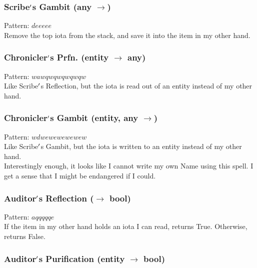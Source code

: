 \documentclass[12pt]{article}
\begin{document}
  \label{sec: patterns/readwrite@hexcasting:write}
\subsubsection*{Scribe$\rq$s Gambit (any $\rightarrow$)}

    Pattern: $deeeee$\\
      Remove the top iota from the stack, and save it into the item in my other hand.\\


  \label{sec: patterns/readwrite@hexcasting:read/entity}
\subsubsection*{Chronicler$\rq$s Prfn. (entity $\rightarrow$ any)}

    Pattern: $wawqwqwqwqwqw$\\
      Like Scribe$\rq$s Reflection, but the iota is read out of an entity instead of my other hand.\\


  \label{sec: patterns/readwrite@hexcasting:write/entity}
\subsubsection*{Chronicler$\rq$s Gambit (entity, any $\rightarrow$)}

    Pattern: $wdwewewewewew$\\
      Like Scribe$\rq$s Gambit, but the iota is written to an entity instead of my other hand.\\Interestingly enough, it looks like I cannot write my own Name using this spell. I get a sense that I might be endangered if I could.\\


  \label{sec: patterns/readwrite@hexcasting:readable}
\subsubsection*{Auditor$\rq$s Reflection ($\rightarrow$ bool)}

    Pattern: $aqqqqqe$\\
      If the item in my other hand holds an iota I can read, returns True. Otherwise, returns False.\\


  \label{sec: patterns/readwrite@hexcasting:readable/entity}
\subsubsection*{Auditor$\rq$s Purification (entity $\rightarrow$ bool)}
\end{document}
